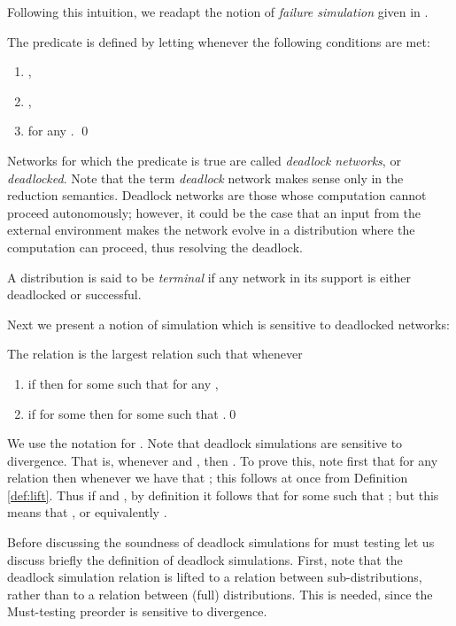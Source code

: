 \documentclass{LMCS}
\begin{document}
Following this intuition, we readapt the notion of \emph{failure 
simulation} given in \cite{DGHM09full}. 
\begin{defi}
\label{def:deadlock}
The predicate  
is defined by letting  whenever the 
following conditions are met:
\begin{enumerate}[label=(\roman*)]
\item ,
\item ,
\item  
for any . \qed
\end{enumerate}
\noindent
Networks for which the predicate  is true 
are called \emph{deadlock networks}, or \emph{deadlocked}. 
Note that the term \emph{deadlock} network makes sense only 
in the reduction semantics. Deadlock networks 
are those whose  computation cannot proceed 
autonomously; however, it could be the case that an 
input from the external environment makes the network 
evolve in a distribution where the computation can 
proceed, thus resolving the deadlock.

A distribution  is said to be \emph{terminal} if 
any network in its support is either deadlocked or 
successful.
\end{defi}
\noindent
Next we present a notion of simulation which is sensitive 
to deadlocked networks:

\begin{defi}
\label{def:ds}
The relation  is 
the largest relation such that whenever 
\begin{enumerate}[label=(\roman*)]
\item if  then  
for some  such that  for any 
, 
\item if  for some 
 then  
for some  such that .\qed
\end{enumerate}
\end{defi}
\noindent
We use the notation  for 
.
Note that deadlock simulations are sensitive to divergence. 
That is, whenever  and , 
then . 
To prove this, note first that for any relation 
 then 
whenever  we have that  
; this follows at once 
from Definition \ref{def:lift}. 
Thus if  and , 
by definition it follows that  
for some  such that ; 
but this means that , 
or equivalently .

Before discussing the soundness of deadlock simulations for must testing
let us discuss briefly the definition of 
deadlock simulations.
First, note that the deadlock simulation relation  is 
lifted to a relation between sub-distributions, rather than 
to a relation between (full) distributions. 
This is needed, since the Must-testing preorder is 
sensitive to divergence.
\end{document}
